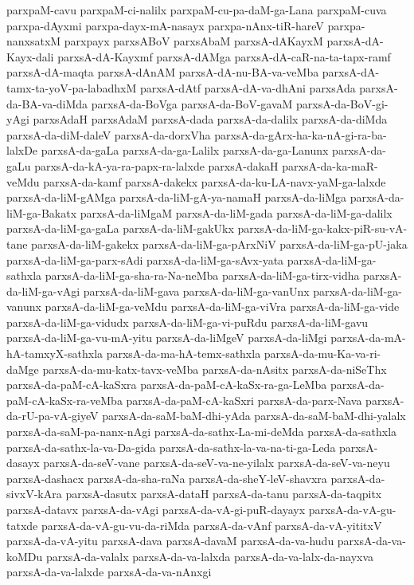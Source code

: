 {parxpaM-cavu
parxpaM-ci-nalilx
parxpaM-cu-pa-daM-ga-Lana
parxpaM-cuva
parxpa-dAyxmi
parxpa-dayx-mA-nasayx
parxpa-nAnx-tiR-hareV
parxpa-nanxsatxM
parxpayx
parxsABoV
parxsAbaM
parxsA-dAKayxM
parxsA-dA-Kayx-dali
parxsA-dA-Kayxmf
parxsA-dAMga
parxsA-dA-caR-na-ta-tapx-ramf
parxsA-dA-maqta
parxsA-dAnAM
parxsA-dA-nu-BA-va-veMba
parxsA-dA-tamx-ta-yoV-pa-labadhxM
parxsA-dAtf
parxsA-dA-va-dhAni
parxsAda
parxsA-da-BA-va-diMda
parxsA-da-BoVga
parxsA-da-BoV-gavaM
parxsA-da-BoV-gi-yAgi
parxsAdaH
parxsAdaM
parxsA-dada
parxsA-da-dalilx
parxsA-da-diMda
parxsA-da-diM-daleV
parxsA-da-dorxVha
parxsA-da-gArx-ha-ka-nA-gi-ra-ba-lalxDe
parxsA-da-gaLa
parxsA-da-ga-Lalilx
parxsA-da-ga-Lanunx
parxsA-da-gaLu
parxsA-da-kA-ya-ra-papx-ra-lalxde
parxsA-dakaH
parxsA-da-ka-maR-veMdu
parxsA-da-kamf
parxsA-dakekx
parxsA-da-ku-LA-navx-yaM-ga-lalxde
parxsA-da-liM-gAMga
parxsA-da-liM-gA-ya-namaH
parxsA-da-liMga
parxsA-da-liM-ga-Bakatx
parxsA-da-liMgaM
parxsA-da-liM-gada
parxsA-da-liM-ga-dalilx
parxsA-da-liM-ga-gaLa
parxsA-da-liM-gakUkx
parxsA-da-liM-ga-kakx-piR-su-vA-tane
parxsA-da-liM-gakekx
parxsA-da-liM-ga-pArxNiV
parxsA-da-liM-ga-pU-jaka
parxsA-da-liM-ga-parx-sAdi
parxsA-da-liM-ga-sAvx-yata
parxsA-da-liM-ga-sathxla
parxsA-da-liM-ga-sha-ra-Na-neMba
parxsA-da-liM-ga-tirx-vidha
parxsA-da-liM-ga-vAgi
parxsA-da-liM-gava
parxsA-da-liM-ga-vanUnx
parxsA-da-liM-ga-vanunx
parxsA-da-liM-ga-veMdu
parxsA-da-liM-ga-viVra
parxsA-da-liM-ga-vide
parxsA-da-liM-ga-vidudx
parxsA-da-liM-ga-vi-puRdu
parxsA-da-liM-gavu
parxsA-da-liM-ga-vu-mA-yitu
parxsA-da-liMgeV
parxsA-da-liMgi
parxsA-da-mA-hA-tamxyX-sathxla
parxsA-da-ma-hA-temx-sathxla
parxsA-da-mu-Ka-va-ri-daMge
parxsA-da-mu-katx-tavx-veMba
parxsA-da-nAsitx
parxsA-da-niSeThx
parxsA-da-paM-cA-kaSxra
parxsA-da-paM-cA-kaSx-ra-ga-LeMba
parxsA-da-paM-cA-kaSx-ra-veMba
parxsA-da-paM-cA-kaSxri
parxsA-da-parx-Nava
parxsA-da-rU-pa-vA-giyeV
parxsA-da-saM-baM-dhi-yAda
parxsA-da-saM-baM-dhi-yalalx
parxsA-da-saM-pa-nanx-nAgi
parxsA-da-sathx-La-mi-deMda
parxsA-da-sathxla
parxsA-da-sathx-la-va-Da-gida
parxsA-da-sathx-la-va-na-ti-ga-Leda
parxsA-dasayx
parxsA-da-seV-vane
parxsA-da-seV-va-ne-yilalx
parxsA-da-seV-va-neyu
parxsA-dashacx
parxsA-da-sha-raNa
parxsA-da-sheY-leV-shavxra
parxsA-da-sivxV-kAra
parxsA-dasutx
parxsA-dataH
parxsA-da-tanu
parxsA-da-taqpitx
parxsA-datavx
parxsA-da-vAgi
parxsA-da-vA-gi-puR-dayayx
parxsA-da-vA-gu-tatxde
parxsA-da-vA-gu-vu-da-riMda
parxsA-da-vAnf
parxsA-da-vA-yititxV
parxsA-da-vA-yitu
parxsA-dava
parxsA-davaM
parxsA-da-va-hudu
parxsA-da-va-koMDu
parxsA-da-valalx
parxsA-da-va-lalxda
parxsA-da-va-lalx-da-nayxva
parxsA-da-va-lalxde
parxsA-da-va-nAnxgi
}
